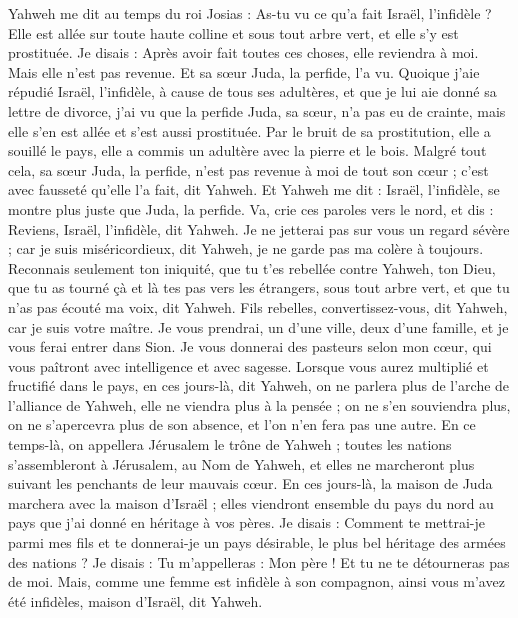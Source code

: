 \begin{multicols}{2}
Yahweh me dit au temps du roi Josias : As-tu vu ce qu'a fait Israël, l'infidèle ? Elle est allée sur toute haute colline et sous tout arbre vert, et elle s'y est prostituée.
Je disais : Après avoir fait toutes ces choses, elle reviendra à moi. Mais elle n'est pas revenue. Et sa sœur Juda, la perfide, l'a vu.
Quoique j'aie répudié Israël, l'infidèle, à cause de tous ses adultères, et que je lui aie donné sa lettre de divorce, j'ai vu que la perfide Juda, sa sœur, n'a pas eu de crainte, mais elle s'en est allée et s'est aussi prostituée.
Par le bruit de sa prostitution, elle a souillé le pays, elle a commis un adultère avec la pierre et le bois.
Malgré tout cela, sa sœur Juda, la perfide, n'est pas revenue à moi de tout son cœur ; c'est avec fausseté qu'elle l'a fait, dit Yahweh.
Et Yahweh me dit : Israël, l'infidèle, se montre plus juste que Juda, la perfide.
Va, crie ces paroles vers le nord, et dis : Reviens, Israël, l'infidèle, dit Yahweh. Je ne jetterai pas sur vous un regard sévère ; car je suis miséricordieux, dit Yahweh, je ne garde pas ma colère à toujours.
Reconnais seulement ton iniquité, que tu t'es rebellée contre Yahweh, ton Dieu, que tu as tourné çà et là tes pas vers les étrangers, sous tout arbre vert, et que tu n'as pas écouté ma voix, dit Yahweh.
Fils rebelles, convertissez-vous, dit Yahweh, car je suis votre maître. Je vous prendrai, un d'une ville, deux d'une famille, et je vous ferai entrer dans Sion.
Je vous donnerai des pasteurs selon mon cœur, qui vous paîtront avec intelligence et avec sagesse.
Lorsque vous aurez multiplié et fructifié dans le pays, en ces jours-là, dit Yahweh, on ne parlera plus de l'arche de l'alliance de Yahweh, elle ne viendra plus à la pensée ; on ne s'en souviendra plus, on ne s'apercevra plus de son absence, et l'on n'en fera pas une autre.
En ce temps-là, on appellera Jérusalem le trône de Yahweh ; toutes les nations s'assembleront à Jérusalem, au Nom de Yahweh, et elles ne marcheront plus suivant les penchants de leur mauvais cœur.
En ces jours-là, la maison de Juda marchera avec la maison d'Israël ; elles viendront ensemble du pays du nord au pays que j'ai donné en héritage à vos pères.
Je disais : Comment te mettrai-je parmi mes fils et te donnerai-je un pays désirable, le plus bel héritage des armées des nations ? Je disais : Tu m'appelleras : Mon père ! Et tu ne te détourneras pas de moi.
Mais, comme une femme est infidèle à son compagnon, ainsi vous m'avez été infidèles, maison d'Israël, dit Yahweh.

\end{multicols}

